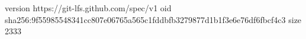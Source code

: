 version https://git-lfs.github.com/spec/v1
oid sha256:9f55985548341cc807e06765a565c1fddbfb3279877d1b1f3e6e76df6fbcf4c3
size 2333
